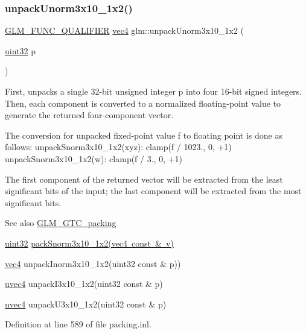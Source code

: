 \subsubsection{\texorpdfstring{unpackUnorm3x10\_1x2()}{unpackUnorm3x10\_1x2()}}
{\footnotesize\ttfamily \mbox{\hyperlink{setup_8hpp_a33fdea6f91c5f834105f7415e2a64407}{G\+L\+M\+\_\+\+F\+U\+N\+C\+\_\+\+Q\+U\+A\+L\+I\+F\+I\+ER}} \mbox{\hyperlink{group__core__types_ga5881b1b022d7fd1b7218f5916532dd02}{vec4}} glm\+::unpack\+Unorm3x10\+\_\+1x2 (\begin{DoxyParamCaption}\item[{\mbox{\hyperlink{group__gtc__type__precision_ga202b6a53c105fcb7e531f9b443518451}{uint32}}}]{p }\end{DoxyParamCaption})}

First, unpacks a single 32-\/bit unsigned integer p into four 16-\/bit signed integers. Then, each component is converted to a normalized floating-\/point value to generate the returned four-\/component vector.

The conversion for unpacked fixed-\/point value f to floating point is done as follows\+: unpack\+Snorm3x10\+\_\+1x2(xyz)\+: clamp(f / 1023., 0, +1) unpack\+Snorm3x10\+\_\+1x2(w)\+: clamp(f / 3., 0, +1)

The first component of the returned vector will be extracted from the least significant bits of the input; the last component will be extracted from the most significant bits.

\begin{DoxySeeAlso}{See also}
\mbox{\hyperlink{group__gtc__packing}{G\+L\+M\+\_\+\+G\+T\+C\+\_\+packing}} 

\mbox{\hyperlink{group__gtc__type__precision_ga202b6a53c105fcb7e531f9b443518451}{uint32}} \mbox{\hyperlink{group__gtc__packing_ga0d4157cec37c0312216a7be1cc92df54}{pack\+Snorm3x10\+\_\+1x2(vec4 const \& v)}} 

\mbox{\hyperlink{group__core__types_ga5881b1b022d7fd1b7218f5916532dd02}{vec4}} unpack\+Inorm3x10\+\_\+1x2(uint32 const \& p)) 

\mbox{\hyperlink{group__core__types_ga1c426d19627b32b14f0089f7f4ba7b1d}{uvec4}} unpack\+I3x10\+\_\+1x2(uint32 const \& p) 

\mbox{\hyperlink{group__core__types_ga1c426d19627b32b14f0089f7f4ba7b1d}{uvec4}} unpack\+U3x10\+\_\+1x2(uint32 const \& p) 
\end{DoxySeeAlso}


Definition at line 589 of file packing.\+inl.

